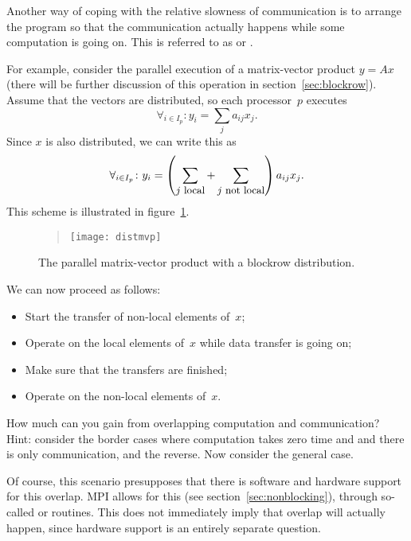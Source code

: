 Another way of coping with the relative slowness of
communication is to arrange the program so that the communication
actually happens while some computation is going on. This is referred
to as  or
.

For example, consider the parallel execution of a matrix-vector
product $y=Ax$ (there will be further discussion of this operation in
section~\ref{sec:blockrow}). Assume that the vectors are distributed,
so each processor~$p$ executes
\[ \forall_{i\in I_p}\colon y_i=\sum_j a_{ij}x_j. \]
Since $x$ is also distributed, we can write this as
\[ \forall_{i\in I_p}\colon y_i=
  \left(\sum_{\mbox{\small $j$ local}}
    +\sum_{\mbox{\small $j$ not local}} \right) a_{ij}x_j. 
\]
This scheme is illustrated in figure~\ref{fig:distmvp}.
\begin{figure}
  \begin{quote}
  \texttt{[image: distmvp]}
  \end{quote}
  \caption{The parallel matrix-vector product with a blockrow
    distribution.}
  \label{fig:distmvp}
\end{figure}
We can now proceed as follows:
\begin{itemize}
\item Start the transfer of non-local elements of~$x$;
\item Operate on the local elements of~$x$ while data transfer is
  going on;
\item Make sure that the transfers are finished;
\item Operate on the non-local elements of~$x$.
\end{itemize}

\begin{exercise}
  How much can you gain from overlapping computation and
  communication?  Hint: consider the border cases where computation
  takes zero time and and there is only communication, and the
  reverse. Now consider the general case.
\end{exercise}

Of course, this scenario presupposes that there is software and
hardware support for this overlap. MPI allows for this (see
section~\ref{sec:nonblocking}), through so-called
 or  routines. This does not immediately imply that
overlap will actually happen, since hardware support is an entirely
separate question.

